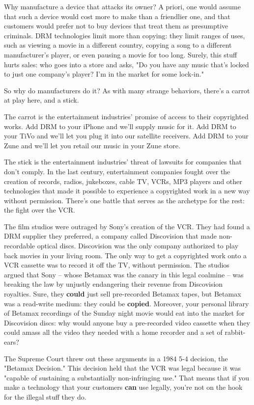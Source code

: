 Why manufacture a device that attacks its owner? A priori, one
would assume that such a device would cost more to make than a
friendlier one, and that customers would prefer not to buy devices
that treat them as presumptive criminals. DRM technologies limit
more than copying: they limit ranges of uses, such as viewing a
movie in a different country, copying a song to a different
manufacturer's player, or even pausing a movie for too long.
Surely, this stuff hurts sales: who goes into a store and asks, "Do
you have any music that's locked to just one company's player? I'm
in the market for some lock-in."

So why do manufacturers do it? As with many strange behaviors,
there's a carrot at play here, and a stick.

The carrot is the entertainment industries' promise of access to
their copyrighted works. Add DRM to your iPhone and we'll supply
music for it. Add DRM to your TiVo and we'll let you plug it into
our satellite receivers. Add DRM to your Zune and we'll let you
retail our music in your Zune store.

The stick is the entertainment industries' threat of lawsuits for
companies that don't comply. In the last century, entertainment
companies fought over the creation of records, radios, jukeboxes,
cable TV, VCRs, MP3 players and other technologies that made it
possible to experience a copyrighted work in a new way without
permission. There's one battle that serves as the archetype for the
rest: the fight over the VCR.

The film studios were outraged by Sony's creation of the VCR. They
had found a DRM supplier they preferred, a company called
Discovision that made non-recordable optical discs. Discovision was
the only company authorized to play back movies in your living
room. The only way to get a copyrighted work onto a VCR cassette
was to record it off the TV, without permission. The studios argued
that Sony -- whose Betamax was the canary in this legal coalmine --
was breaking the law by unjustly endangering their revenue from
Discovision royalties. Sure, they \textbf{could} just sell
pre-recorded Betamax tapes, but Betamax was a read-write medium:
they could be \textbf{copied}. Moreover, your personal library of
Betamax recordings of the Sunday night movie would eat into the
market for Discovision discs: why would anyone buy a pre-recorded
video cassette when they could amass all the video they needed with
a home recorder and a set of rabbit-ears?

The Supreme Court threw out these arguments in a 1984 5-4 decision,
the "Betamax Decision." This decision held that the VCR was legal
because it was "capable of sustaining a substantially
non-infringing use." That means that if you make a technology that
your customers \textbf{can} use legally, you're not on the hook for
the illegal stuff they do.

